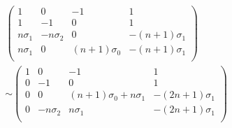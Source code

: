 \begin{displaymath}
    \begin{split}
    &\left(
    \begin{array}{cccc}
        1          & 0        & -1            & 1              \\
        1          & -1       & 0             & 1              \\
        n \sigma_1 & -n\sigma_2 & 0           & -(n+1)\sigma_1 \\
        n\sigma_1  & 0        & (n+1)\sigma_0 & -(n+1)\sigma_1 \\
    \end{array}
    \right)
    \\
    &\sim
    \left(
    \begin{array}{cccc}
        1          & 0          & -1                       & 1              \\
        0          & -1         & 0                        & 1              \\
        0          & 0          & (n+1)\sigma_0 +n\sigma_1 & -(2n+1)\sigma_1\\
        0          & -n\sigma_2 & n\sigma_1                & -(2n+1)\sigma_1 \\
    \end{array}
    \right)
    \\
    \end{split}
\end{displaymath}
